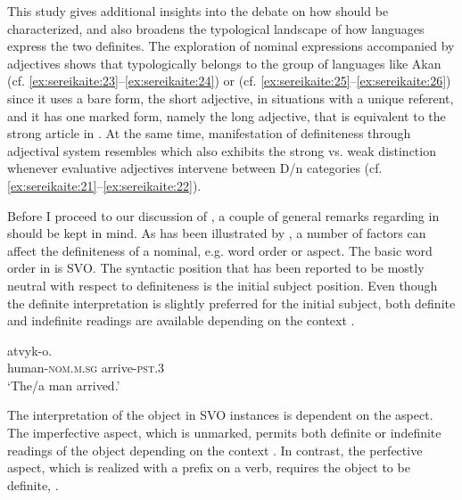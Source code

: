 \documentclass[output=paper,
modfonts
]{langscibook}
\begin{document}
This study gives additional insights into the debate on how  should be characterized, and also broadens the typological landscape of how languages express the two definites. The exploration of nominal expressions accompanied by adjectives shows that  typologically belongs to the group of languages like Akan (cf. \ref{ex:sereikaite:23}--\ref{ex:sereikaite:24}) or  (cf. \ref{ex:sereikaite:25}--\ref{ex:sereikaite:26}) since it uses a bare form, the short adjective, in situations with a unique referent, and it has one marked form, namely the long adjective, that is equivalent to the strong article in . At the same time,  manifestation of definiteness through adjectival system resembles  which also exhibits the strong vs. weak distinction whenever evaluative adjectives intervene between D/n categories (cf. \ref{ex:sereikaite:21}--\ref{ex:sereikaite:22}).

Before I proceed to our discussion of , a couple of general remarks regarding  in  should be kept in mind. As has been illustrated by \citet{GillonArmoskaite2015}, a number of factors can affect the definiteness of a nominal, e.g. word order or aspect. The basic word order in  is SVO. The syntactic position that has been reported to be mostly neutral with respect to definiteness is the initial subject position. Even though the definite interpretation is slightly preferred for the initial subject, both definite and indefinite readings are available depending on the context .

\begin{exe} 
\ex \label{ex:sereikaite:29}
 {atvyk-o}.\\
human-\textsc{nom.m.sg} arrive-\textsc{pst.3}\\
\trans `The/a man arrived.' \citep[74]{GillonArmoskaite2015}
\end{exe} 

The interpretation of the object in SVO instances is dependent on the aspect. The imperfective aspect, which is unmarked, permits both definite or indefinite readings of the object depending on the context . In contrast, the perfective aspect, which is realized with a prefix on a verb, requires the object to be definite, . %
\end{document}
